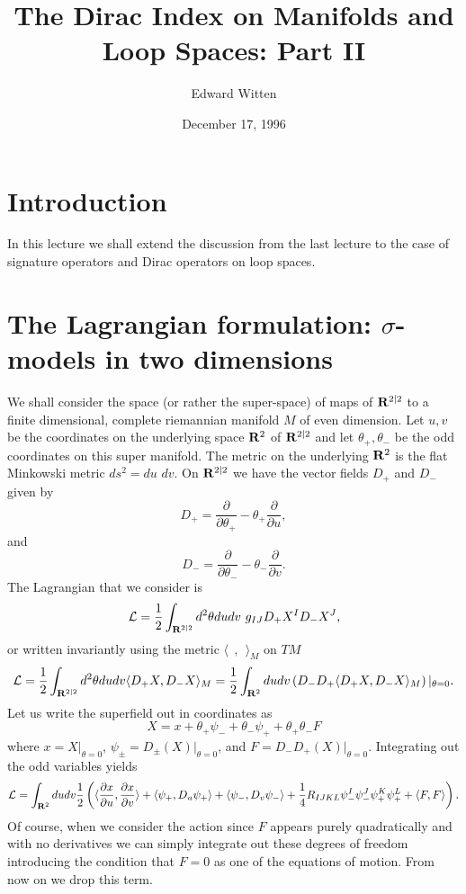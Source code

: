 








\title{The Dirac Index on Manifolds and Loop Spaces: Part II}
\author{Edward Witten}
\date{December 17, 1996}


\maketitle


\section{Introduction}
In this lecture we shall extend the discussion from the last lecture
to the case of signature operators and Dirac operators on loop spaces.

\section{The Lagrangian formulation: $\sigma$-models in two dimensions}

We shall consider the space (or rather the super-space) of maps of
${\bf R}^{2|2}$ to a finite dimensional, complete riemannian manifold
$M$ of even dimension. 
Let $u,v$ be the coordinates on the underlying space ${\bf R}^2$ of
${\bf R}^{2|2}$ and
let $\theta_+,\theta_-$ be the odd coordinates on this super manifold.
The metric on the underlying ${\bf R}^2$ is  the flat Minkowski metric
$ds^2=du\,\,dv$.
On ${\bf R}^{2|2}$ we have the vector fields $D_+$ and $D_-$ given by
$$D_+=\frac{\partial}{\partial \theta_+}-\theta_+\frac{\partial}{\partial
u},$$
and
$$D_-=\frac{\partial}{\partial \theta_-}-\theta_-\frac{\partial}{\partial
v}.$$
The Lagrangian that we consider is
$${\cal L}=\frac{1}{2}\int_{{\bf
R}^{2|2}}d^2\theta dudv\ g_{IJ}D_+X^ID_-X^J,$$ 
or written invariantly using the metric $\langle\ \ ,\ \ \rangle_M$ on $TM$
$${\cal L}=\frac{1}{2}\int_{{\bf R}^{2|2}} d^2\theta dudv\langle
D_+X,D_-X\rangle _M=\frac{1}{2}\int_{{\bf R}^2}dudv\left(D_-D_+\langle
D_+X,D_-X\rangle_M\right)|_{\theta=0} .$$
Let us write the superfield out in coordinates as
$$X=x+\theta_+\psi_-+\theta_-\psi_++\theta_+\theta_-F$$
where $x=X|_{\theta=0}$, $\psi_\pm=D_\pm(X)|_{\theta=0}$, and
$F=D_-D_+(X)|_{\theta=0}$.
Integrating out the odd variables yields
$${\cal L}=\int_{{\bf R}^2}dudv\frac{1}{2}\left( \langle\frac{\partial
x}{\partial u},\frac{\partial x}{\partial v}\rangle +\langle
\psi_+,D_u\psi_+\rangle+\langle \psi_-,D_v\psi_-\rangle +\frac{1}{4}
R_{IJKL}\psi_-^I\psi_-^J\psi_+^K\psi_+^L +\langle F,F\rangle\right).$$
Of course, when we consider the action since $F$ appears purely
quadratically and with no derivatives we can simply integrate out
these degrees of freedom introducing the condition that $F=0$ as one
of the equations of motion.  From now on we drop this term.


